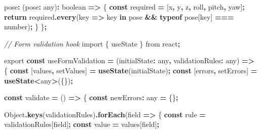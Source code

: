 \documentclass[
]{article}
\newenvironment{Shaded}{\begin{snugshade}}{\end{snugshade}}
\newcommand{\BuiltInTok}[1]{#1}
\newcommand{\CommentTok}[1]{\textcolor[rgb]{0.56,0.35,0.01}{\textit{#1}}}
\newcommand{\ControlFlowTok}[1]{\textcolor[rgb]{0.13,0.29,0.53}{\textbf{#1}}}
\newcommand{\DataTypeTok}[1]{\textcolor[rgb]{0.13,0.29,0.53}{#1}}
\newcommand{\FunctionTok}[1]{\textcolor[rgb]{0.13,0.29,0.53}{\textbf{#1}}}
\newcommand{\ImportTok}[1]{#1}
\newcommand{\KeywordTok}[1]{\textcolor[rgb]{0.13,0.29,0.53}{\textbf{#1}}}
\newcommand{\NormalTok}[1]{#1}
\newcommand{\OperatorTok}[1]{\textcolor[rgb]{0.81,0.36,0.00}{\textbf{#1}}}
\newcommand{\StringTok}[1]{\textcolor[rgb]{0.31,0.60,0.02}{#1}}
\begin{document}
\begin{Shaded}
\begin{Highlighting}[]
\NormalTok{  pose}\OperatorTok{:}\NormalTok{ (pose}\OperatorTok{:} \DataTypeTok{any}\NormalTok{)}\OperatorTok{:} \DataTypeTok{boolean} \KeywordTok{=\textgreater{}}\NormalTok{ \{}
    \KeywordTok{const}\NormalTok{ required }\OperatorTok{=}\NormalTok{ [}\StringTok{\textquotesingle{}x\textquotesingle{}}\OperatorTok{,} \StringTok{\textquotesingle{}y\textquotesingle{}}\OperatorTok{,} \StringTok{\textquotesingle{}z\textquotesingle{}}\OperatorTok{,} \StringTok{\textquotesingle{}roll\textquotesingle{}}\OperatorTok{,} \StringTok{\textquotesingle{}pitch\textquotesingle{}}\OperatorTok{,} \StringTok{\textquotesingle{}yaw\textquotesingle{}}\NormalTok{]}\OperatorTok{;}
    \ControlFlowTok{return}\NormalTok{ required}\OperatorTok{.}\FunctionTok{every}\NormalTok{(key }\KeywordTok{=\textgreater{}}\NormalTok{ key }\KeywordTok{in}\NormalTok{ pose }\OperatorTok{\&\&} \KeywordTok{typeof}\NormalTok{ pose[key] }\OperatorTok{===} \StringTok{\textquotesingle{}number\textquotesingle{}}\NormalTok{)}\OperatorTok{;}
\NormalTok{  \}}
\NormalTok{\}}\OperatorTok{;}

\CommentTok{// Form validation hook}
\ImportTok{import}\NormalTok{ \{ useState \} }\ImportTok{from} \StringTok{\textquotesingle{}react\textquotesingle{}}\OperatorTok{;}

\ImportTok{export} \KeywordTok{const}\NormalTok{ useFormValidation }\OperatorTok{=}\NormalTok{ (initialState}\OperatorTok{:} \DataTypeTok{any}\OperatorTok{,}\NormalTok{ validationRules}\OperatorTok{:} \DataTypeTok{any}\NormalTok{) }\KeywordTok{=\textgreater{}}\NormalTok{ \{}
  \KeywordTok{const}\NormalTok{ [values}\OperatorTok{,}\NormalTok{ setValues] }\OperatorTok{=} \FunctionTok{useState}\NormalTok{(initialState)}\OperatorTok{;}
  \KeywordTok{const}\NormalTok{ [errors}\OperatorTok{,}\NormalTok{ setErrors] }\OperatorTok{=} \FunctionTok{useState}\OperatorTok{\textless{}}\DataTypeTok{any}\OperatorTok{\textgreater{}}\NormalTok{(\{\})}\OperatorTok{;}

  \KeywordTok{const}\NormalTok{ validate }\OperatorTok{=}\NormalTok{ () }\KeywordTok{=\textgreater{}}\NormalTok{ \{}
    \KeywordTok{const}\NormalTok{ newErrors}\OperatorTok{:} \DataTypeTok{any} \OperatorTok{=}\NormalTok{ \{\}}\OperatorTok{;}

    \BuiltInTok{Object}\OperatorTok{.}\FunctionTok{keys}\NormalTok{(validationRules)}\OperatorTok{.}\FunctionTok{forEach}\NormalTok{(field }\KeywordTok{=\textgreater{}}\NormalTok{ \{}
      \KeywordTok{const}\NormalTok{ rule }\OperatorTok{=}\NormalTok{ validationRules[field]}\OperatorTok{;}
      \KeywordTok{const}\NormalTok{ value }\OperatorTok{=}\NormalTok{ values[field]}\OperatorTok{;}


\end{Highlighting}
\end{Shaded}
\end{document}
